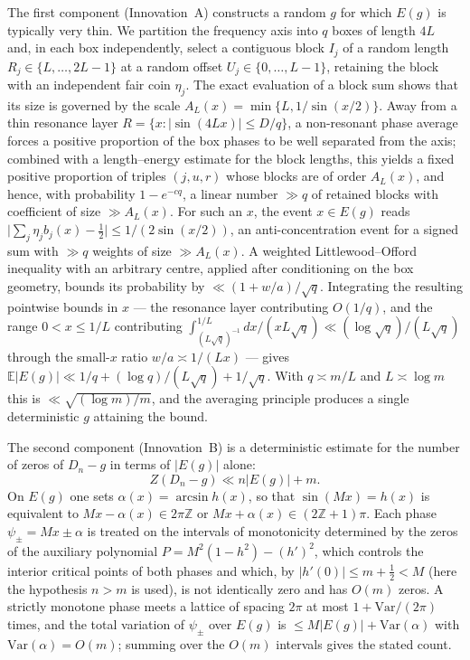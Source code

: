 \documentclass[11pt,reqno]{amsart}
\theoremstyle{plain}
\theoremstyle{definition}
\theoremstyle{remark}
\begin{document}
The first component (Innovation~A) constructs a random $g$ for which $E(g)$ is typically very thin. We partition the frequency axis into $q$ boxes of length $4L$ and, in each box independently, select a contiguous block $I_j$ of a random length $R_j\in\{L,\dots,2L-1\}$ at a random offset $U_j\in\{0,\dots,L-1\}$, retaining the block with an independent fair coin $\eta_j$. The exact evaluation of a block sum shows that its size is governed by the scale $A_L(x)=\min\{L,1/\sin(x/2)\}$. Away from a thin resonance layer $R=\{x:\lvert\sin(4Lx)\rvert\le D/q\}$, a non-resonant phase average forces a positive proportion of the box phases to be well separated from the axis; combined with a length--energy estimate for the block lengths, this yields a fixed positive proportion of triples $(j,u,r)$ whose blocks are of order $A_L(x)$, and hence, with probability $1-e^{-cq}$, a linear number $\gg q$ of retained blocks with coefficient of size $\gg A_L(x)$. For such an $x$, the event $x\in E(g)$ reads $\lvert\sum_j\eta_j b_j(x)-\tfrac12\rvert\le 1/(2\sin(x/2))$, an anti-concentration event for a signed sum with $\gg q$ weights of size $\gg A_L(x)$. A weighted Littlewood--Offord inequality with an arbitrary centre, applied after conditioning on the box geometry, bounds its probability by $\ll(1+w/a)/\sqrt{q}$. Integrating the resulting pointwise bounds in $x$ — the resonance layer contributing $O(1/q)$, and the range $0<x\le 1/L$ contributing $\int_{(L\sqrt q)^{-1}}^{1/L}dx/(xL\sqrt q)\ll(\log\sqrt q)/(L\sqrt q)$ through the small-$x$ ratio $w/a\asymp 1/(Lx)$ — gives $\mathbb{E}\lvert E(g)\rvert\ll 1/q+(\log q)/(L\sqrt q)+1/\sqrt q$. With $q\asymp m/L$ and $L\asymp\log m$ this is $\ll\sqrt{(\log m)/m}$, and the averaging principle produces a single deterministic $g$ attaining the bound.

The second component (Innovation~B) is a deterministic estimate for the number of zeros of $D_n-g$ in terms of $\lvert E(g)\rvert$ alone:
\[
Z(D_n-g)\ll n\lvert E(g)\rvert + m.
\]
On $E(g)$ one sets $\alpha(x)=\arcsin h(x)$, so that $\sin(Mx)=h(x)$ is equivalent to $Mx-\alpha(x)\in 2\pi\mathbb{Z}$ or $Mx+\alpha(x)\in(2\mathbb{Z}+1)\pi$. Each phase $\psi_\pm=Mx\pm\alpha$ is treated on the intervals of monotonicity determined by the zeros of the auxiliary polynomial $P=M^2(1-h^2)-(h')^2$, which controls the interior critical points of both phases and which, by $\lvert h'(0)\rvert\le m+\tfrac12<M$ (here the hypothesis $n>m$ is used), is not identically zero and has $O(m)$ zeros. A strictly monotone phase meets a lattice of spacing $2\pi$ at most $1+\mathrm{Var}/(2\pi)$ times, and the total variation of $\psi_\pm$ over $E(g)$ is $\le M\lvert E(g)\rvert+\mathrm{Var}(\alpha)$ with $\mathrm{Var}(\alpha)=O(m)$; summing over the $O(m)$ intervals gives the stated count.
\end{document}
